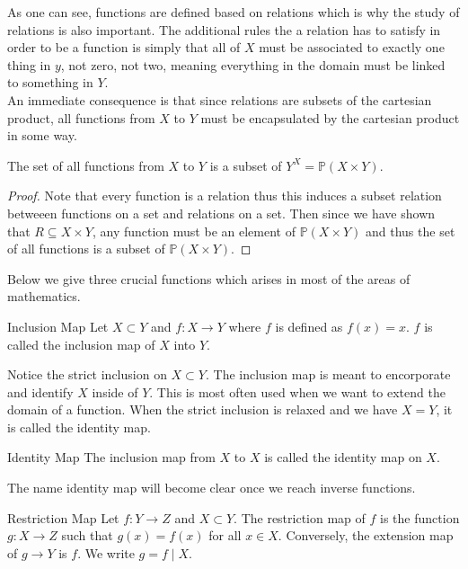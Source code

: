 \documentclass[a4paper]{article}
\begin{document}
As one can see, functions are defined based on relations which is why the study of relations is also important. The additional rules the a relation has to satisfy in order to be a function is simply that all of $X$ must be associated to exactly one thing in $y$, not zero, not two, meaning everything in the domain must be linked to something in $Y$. \\

An immediate consequence is that since relations are subsets of the cartesian product, all functions from $X$ to $Y$ must be encapsulated by the cartesian product in some way. 

\begin{prp}{}{} The set of all functions from $X$ to $Y$ is a subset of $Y^X=\mathbb{P}(X\times Y)$. 
\begin{proof}{}{} Note that every function is a relation thus this induces a subset relation betweeen functions on a set and relations on a set. Then since we have shown that $R\subseteq X\times Y$, any function must be an element of $\mathbb{P}(X\times Y)$ and thus the set of all functions is a subset of $\mathbb{P}(X\times Y)$. 
\end{proof}
\end{prp}

Below we give three crucial functions which arises in most of the areas of mathematics. 

\begin{defn}{Inclusion Map}{} Let $X\subset Y$ and $f:X\to Y$ where $f$ is defined as $f(x)=x$. $f$ is called the inclusion map of $X$ into $Y$. 
\end{defn}

Notice the strict inclusion on $X\subset Y$. The inclusion map is meant to encorporate and identify $X$ inside of $Y$. This is most often used when we want to extend the domain of a function. When the strict inclusion is relaxed and we have $X=Y$, it is called the identity map. 

\begin{defn}{Identity Map}{} The inclusion map from $X$ to $X$ is called the identity map on $X$. 
\end{defn}

The name identity map will become clear once we reach inverse functions. 

\begin{defn}{Restriction Map}{} Let $f:Y\to Z$ and $X\subset Y$. The restriction map of $f$ is the function $g:X\to Z$ such that $g(x)=f(x)$ for all $x\in X$. Conversely, the extension map of $g\to Y$ is $f$. We write $g=f\;|\;X$. 
\end{defn}
\end{document}
